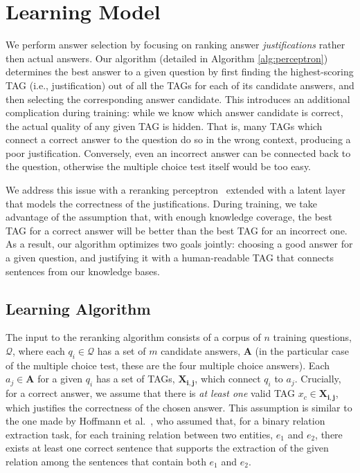 \section{Learning Model}
\label{sec:perceptron}

We perform answer selection by focusing on ranking answer {\em justifications} rather then actual answers. 
Our algorithm (detailed in Algorithm \ref{alg:perceptron}) determines the best answer to a given question by first finding the highest-scoring TAG (i.e., justification) out of all the TAGs for each of its candidate answers, and then selecting the corresponding answer candidate.  
This introduces an additional complication during training: while we know which answer candidate is correct, the actual quality of any given TAG is hidden. That is, many TAGs which connect a correct answer to the question do so in the wrong context, producing a poor justification. Conversely, even an incorrect answer can be connected back to the question, otherwise the multiple choice test itself would be too easy. 

We address this issue with a reranking perceptron~\cite{Shen:Joshi:2005,Surdeanu:11} extended with a latent layer that models the correctness of the justifications. 
During training, we take advantage of the assumption that, with enough knowledge coverage, the best TAG for a correct answer will be better than the best TAG for an incorrect one.  As a result, our algorithm optimizes two goals jointly: choosing a good answer for a given question, and justifying it with a human-readable TAG that connects sentences from our knowledge bases.

\subsection {Learning Algorithm}
\label{sec:model}

The input to the reranking algorithm consists of a corpus of $n$ training questions, $\boldsymbol{\mathcal{Q}}$, where each $q_i \in \boldsymbol{\mathcal{Q}}$ has a set of $m$ candidate answers, $\boldsymbol{A}$ (in the particular case of the multiple choice test, these are the four multiple choice answers).  Each $a_j \in \boldsymbol{A}$ for a given $q_i$ has a set of TAGs, $\boldsymbol{X_{i,j}}$, which connect $q_i$ to $a_j$.  
Crucially, for a correct answer, we assume that there is {\em at least one} valid TAG $x_c \in \boldsymbol{X_{i,j}}$, which justifies the correctness of the chosen answer. This assumption is similar to the one made by Hoffmann et al.~, who assumed that, for a binary relation extraction task, for each training relation between two entities, $e_1$ and $e_2$, there exists at least one correct sentence that supports the extraction of the given relation among the sentences that contain both $e_1$ and $e_2$.

